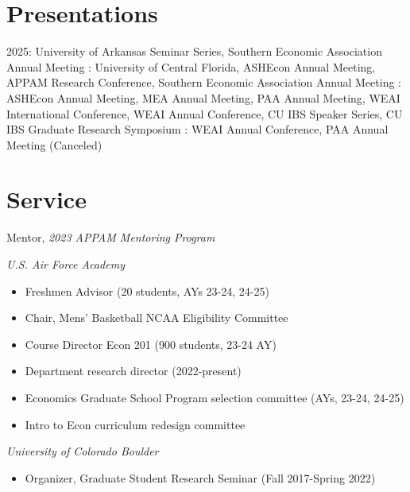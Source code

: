 \documentclass[letterpaper]{article}
\begin{document}
\section*{Presentations}
2025: University of Arkansas Seminar Series, Southern Economic Association Annual Meeting
\newline{}: University of Central Florida, ASHEcon Annual Meeting, APPAM Research Conference, Southern Economic Association Annual Meeting
\newline{}: ASHEcon Annual Meeting, MEA Annual Meeting, PAA Annual Meeting, WEAI International Conference, WEAI Annual Conference, CU IBS Speaker Series, CU IBS Graduate Research Symposium
\newline{}: WEAI Annual Conference, PAA Annual Meeting (Canceled)

\section*{Service}
Mentor, \textit{2023 APPAM Mentoring Program}
\vspace*{.5em}

\textit{U.S. Air Force Academy}
  \begin{itemize}[topsep=2pt,itemsep=-1pt,leftmargin=1em]
    \item[] Freshmen Advisor (20 students, AYs 23-24, 24-25)
    \item[] Chair, Mens' Basketball NCAA Eligibility Committee
    \item[] Course Director Econ 201 (900 students, 23-24 AY)
    \item[] Department research director (2022-present)
    \item[] Economics Graduate School Program selection committee (AYs, 23-24, 24-25)
    \item[] Intro to Econ curriculum redesign committee
  \end{itemize}
  \vspace*{.5em}
\textit{University of Colorado Boulder}
  \begin{itemize}[topsep=2pt,itemsep=-1pt,leftmargin=1em]
    \item[] Organizer, Graduate Student Research Seminar (Fall 2017-Spring 2022)
  \end{itemize}
\end{document}
